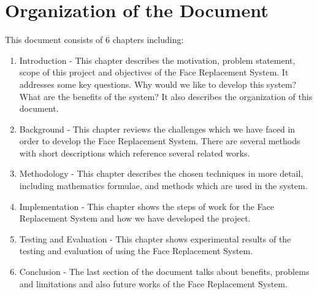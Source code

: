 \section{Organization of the Document}
This document consists of 6 chapters including:
\begin{enumerate}
\item Introduction - This chapter describes the motivation, problem statement, scope of this project and objectives of the Face Replacement System. It addresses some key questions. Why would we like to develop this system? What are the benefits of the system? It also describes the organization of this document.
\item Background - This chapter reviews the challenges which we have faced in order to develop the Face Replacement System. There are several methods with short descriptions which reference several related works.
\item Methodology - This chapter describes the chosen techniques in more detail, including mathematics formulae, and methods which are used in the system.
\item Implementation - This chapter shows the steps of work for the Face Replacement System and how we have developed the project.
\item Testing and Evaluation - This chapter shows experimental results of the testing and evaluation of using the Face Replacement System.
\item Conclusion - The last section of the document talks about benefits, problems and limitations and also future works of the Face Replacement System.
\end{enumerate} 